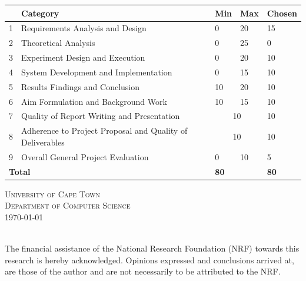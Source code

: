 \begin{titlepage}
\begin{center}
\vfill
\begin{table}[h]
\centering
\begin{tabular}{|l|p{7.5cm}|l|l|l|}
\hline
& \textbf{Category} & \textbf{Min} & \textbf{Max} & \textbf{Chosen} \\
\hline
1 & Requirements Analysis and Design & 0 & 20 & 15 \\
\hline
2 & Theoretical Analysis & 0 & 25 & 0 \\
\hline
3 & Experiment Design and Execution & 0 & 20 & 10 \\
\hline
4 & System Development and Implementation & 0 & 15 & 10 \\
\hline
5 & Results Findings and Conclusion & 10 & 20 & 10 \\
\hline
6 & Aim Formulation and Background Work & 10 & 15 & 10 \\
\hline
7 & Quality of Report Writing and Presentation &
\multicolumn{2}{|c|}{10}  & 10 \\
\hline
8 & Adherence to Project Proposal and Quality of Deliverables &
\multicolumn{2}{|c|}{10}  & 10 \\
\hline
9 & Overall General Project Evaluation & 0 & 10 & 5 \\
\hline
\multicolumn{2}{|l|}{\textbf{Total}} & \multicolumn{2}{|l|}{\textbf{80}} & \textbf{80} \\
\hline
\end{tabular}
\end{table}




\textsc{\Large University of Cape Town}\\[0.5cm]
\textsc{\Large Department of Computer Science}\\[0.5cm]
{\large \today} \\
\end{center}
\HRule \\[0.2cm]
{\raggedleft The financial assistance of the National Research Foundation (NRF) towards this research is hereby acknowledged. Opinions
expressed and conclusions arrived at, are those of the author and are not necessarily to be attributed to the NRF.}\\
\HRule \\[0.2cm]



\end{titlepage}
